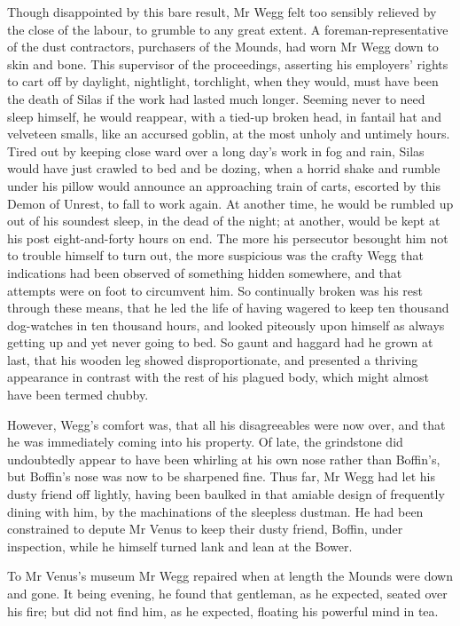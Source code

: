 Though disappointed by this bare result, Mr Wegg felt too sensibly
relieved by the close of the labour, to grumble to any great extent.
A foreman-representative of the dust contractors, purchasers of the
Mounds, had worn Mr Wegg down to skin and bone. This supervisor of the
proceedings, asserting his employers’ rights to cart off by daylight,
nightlight, torchlight, when they would, must have been the death of
Silas if the work had lasted much longer. Seeming never to need sleep
himself, he would reappear, with a tied-up broken head, in fantail hat
and velveteen smalls, like an accursed goblin, at the most unholy and
untimely hours. Tired out by keeping close ward over a long day’s work
in fog and rain, Silas would have just crawled to bed and be dozing,
when a horrid shake and rumble under his pillow would announce an
approaching train of carts, escorted by this Demon of Unrest, to fall to
work again. At another time, he would be rumbled up out of his soundest
sleep, in the dead of the night; at another, would be kept at his post
eight-and-forty hours on end. The more his persecutor besought him not
to trouble himself to turn out, the more suspicious was the crafty Wegg
that indications had been observed of something hidden somewhere, and
that attempts were on foot to circumvent him. So continually broken was
his rest through these means, that he led the life of having wagered
to keep ten thousand dog-watches in ten thousand hours, and looked
piteously upon himself as always getting up and yet never going to bed.
So gaunt and haggard had he grown at last, that his wooden leg showed
disproportionate, and presented a thriving appearance in contrast
with the rest of his plagued body, which might almost have been termed
chubby.

However, Wegg’s comfort was, that all his disagreeables were now over,
and that he was immediately coming into his property. Of late, the
grindstone did undoubtedly appear to have been whirling at his own nose
rather than Boffin’s, but Boffin’s nose was now to be sharpened fine.
Thus far, Mr Wegg had let his dusty friend off lightly, having been
baulked in that amiable design of frequently dining with him, by the
machinations of the sleepless dustman. He had been constrained to depute
Mr Venus to keep their dusty friend, Boffin, under inspection, while he
himself turned lank and lean at the Bower.

To Mr Venus’s museum Mr Wegg repaired when at length the Mounds
were down and gone. It being evening, he found that gentleman, as he
expected, seated over his fire; but did not find him, as he expected,
floating his powerful mind in tea.


